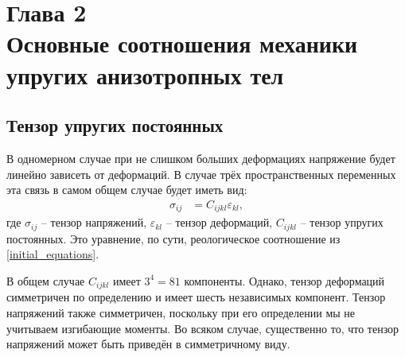 \section*{Глава 2\\Основные соотношения механики упругих анизотропных тел}
\setcounter{section}{2}
\setcounter{subsection}{0}
\setcounter{equation}{0}

\subsection{Тензор упругих постоянных}

	В одномерном случае при не слишком больших деформациях напряжение будет линейно зависеть от деформаций.
	В случае трёх пространственных переменных эта связь в самом общем случае будет иметь вид\cite{resler}:
\begin{align}
	\label{rheology_equation}
	\sigma_{ij} &= C_{ijkl}\varepsilon_{kl},
\end{align}
	где $\sigma_{ij}$ -- тензор напряжений, $\varepsilon_{kl}$ -- тензор деформаций, $C_{ijkl}$ -- тензор упругих постоянных. 
	Это уравнение, по сути, реологическое соотношение из \eqref{initial_equations}.
	
	В общем случае $C_{ijkl}$ имеет $3^{4} = 81$ компоненты. Однако, тензор деформаций симметричен по определению и имеет шесть независимых компонент.
	Тензор напряжений также симметричен, поскольку при его определении мы не учитываем изгибающие моменты\cite{resler}. 
	Во всяком случае, существенно то, что тензор напряжений может быть приведён в симметричному виду\cite{landau_lifshits}.
	
